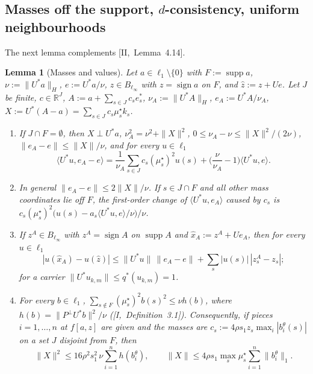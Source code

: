 \documentclass[10pt]{amsart}
\newtheorem{lemma}[theorem]{Lemma}
\theoremstyle{definition}
\theoremstyle{remark}
\newcommand{\supp}{\operatorname{supp}}
\newcommand{\sgn}{\operatorname{sign}}
\newcommand{\R}{\mathbb R}
\newcommand{\zh}{\hat z}
\newcommand{\ip}[2]{\langle #1,#2\rangle}
\begin{document}
\subsection{Masses off the support, $d$-consistency, uniform neighbourhoods}
\label{subsec:III-prelim}

The next lemma complements [II,~Lemma~4.14].

\begin{lemma}[Masses and values]\label{lem:III-masses}
Let $a\in\ell_1\setminus\{0\}$ with $F:=\supp a$, $\nu:=\|U^*a\|_H$,
$e:=U^*a/\nu$, $z\in B_{\ell_\infty}$ with $z=\sgn a$ on $F$, and $\zh:=z+Ue$.
Let $J$ be finite, $c\in\R^J$, $A:=a+\sum_{s\in J}c_se^*_s$, $\nu_A:=
\|U^*A\|_H$, $e_A:=U^*A/\nu_A$, $X:=U^*(A-a)=\sum_{s\in J}c_s\mu^\star_sk_s$.
\begin{enumerate}
\item[(i)] If $J\cap F=\emptyset$, then $X\perp U^*a$, $\nu_A^2=\nu^2+\|X\|^2$,
$0\le\nu_A-\nu\le\|X\|^2/(2\nu)$, $\|e_A-e\|\le\|X\|/\nu$, and for every
$u\in\ell_1$
\[
 \ip{U^*u}{e_A-e}=\frac1{\nu_A}\sum_{s\in J}c_s(\mu^\star_s)^2u(s)+
 \Big(\frac\nu{\nu_A}-1\Big)\ip{U^*u}{e} .
\]
\item[(ii)] In general $\|e_A-e\|\le2\|X\|/\nu$.  If $s\in J\cap F$ and all
other mass coordinates lie off $F$, the first-order change of
$\ip{U^*u}{e_A}$ caused by $c_s$ is $c_s(\mu^\star_s)^2\big(u(s)-a_s\ip{U^*u}{e}/
\nu\big)/\nu$.
\item[(iii)] If $z^A\in B_{\ell_\infty}$ with $z^A=\sgn A$ on $\supp A$ and
$\hat x_A:=z^A+Ue_A$, then for every $u\in\ell_1$
\[
 |u(\hat x_A)-u(\zh)|\le\|U^*u\|\,\|e_A-e\|+\sum_s|u(s)|\,|z^A_s-z_s| ;
\]
for a carrier $\|U^*u_{k,m}\|\le q^*(u_{k,m})=1$.
\item[(iv)] For every $b\in\ell_1$, $\sum_{s\notin F}(\mu^\star_s)^2b(s)^2\le
\nu h(b)$, where $h(b)=\|P^\perp U^*b\|^2/\nu$ \textup{(}[I,~Definition~3.1]\textup{)}.
Consequently, if pieces $i=1,\dots,n$ at $f[a,z]$ are given and the masses are
$c_s:=4\rho s_1z_s\max_i|b^\theta_i(s)|$ on a set $J$ disjoint from $F$, then
\[
 \|X\|^2\le16\rho^2s_1^2\,\nu\sum_{i=1}^nh(b^\theta_i),\qquad
 \|X\|\le4\rho s_1\max_s\mu^\star_s\sum_{i=1}^n\|b^\theta_i\|_1 .
\]
\end{enumerate}
\end{lemma}
\end{document}

